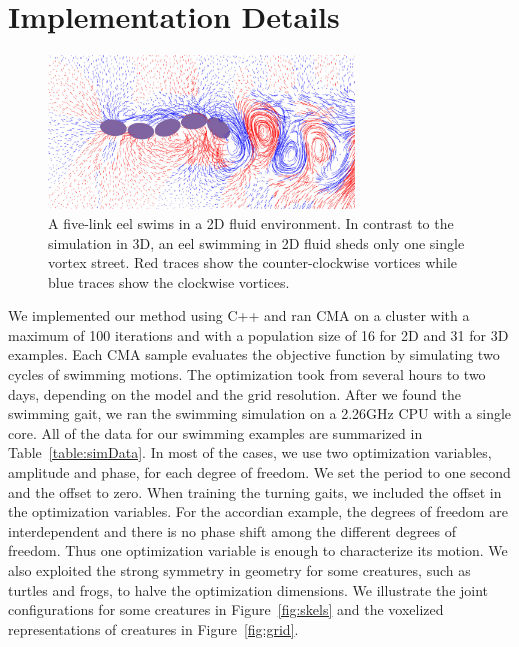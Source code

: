 \section{Implementation Details}


\begin{figure}[!b]
\centering
\includegraphics[width=3.2in]{figures/eel2D.eps}
\caption{A five-link eel swims in a 2D fluid environment. In contrast to the simulation in 3D, an eel swimming in 2D fluid sheds only one single vortex street. Red traces show the counter-clockwise vortices while blue traces show the clockwise vortices.}
\label{fig:eel2D}
\end{figure}

We implemented our method using C++ and ran CMA on a cluster with a
maximum of 100 iterations and with a population size of 16 for 2D and 31 for 3D
examples. Each CMA sample evaluates the objective function by simulating
two cycles of swimming motions. The optimization took from several hours
to two days, depending on the model and the grid resolution. After we
found the swimming gait, we ran the swimming simulation on a 2.26GHz CPU
with a single core.  All of the data for our swimming examples are
summarized in Table~\ref{table:simData}. In most of the cases, we use two
optimization variables, amplitude and phase, for each degree of freedom.
We set the period to one second and the offset to zero. When training the
turning gaits, we included the offset in the optimization variables. For the
accordian example, the degrees of freedom are interdependent and there is
no phase shift among the different degrees of freedom. Thus one
optimization variable is enough to characterize its motion. We also
exploited the strong symmetry in geometry for some creatures, such as
turtles and frogs, to halve the optimization dimensions. We illustrate the
joint configurations for some creatures in Figure~\ref{fig:skels} and the voxelized representations of creatures in Figure~\ref{fig:grid}.


